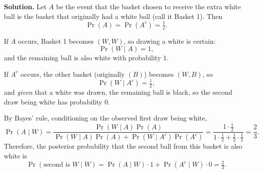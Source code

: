\documentclass{article}
\begin{document}
\textbf{Solution.}
Let $A$ be the event that the basket chosen to receive the extra white ball is the basket that originally had a white ball (call it Basket 1). Then
\[
\Pr(A)=\Pr(A^c)=\tfrac12.
\]

If $A$ occurs, Basket 1 becomes $(W,W)$, so drawing a white is certain:
\[
\Pr(W\mid A)=1,
\]
and the remaining ball is also white with probability $1$.

If $A^c$ occurs, the other basket (originally $(B)$) becomes $(W,B)$, so
\[
\Pr(W\mid A^c)=\tfrac12,
\]
and \emph{given} that a white was drawn, the remaining ball is black, so the second draw being white has probability $0$.

By Bayes' rule, conditioning on the observed first draw being white,
\[
\Pr(A\mid W)=\frac{\Pr(W\mid A)\Pr(A)}{\Pr(W\mid A)\Pr(A)+\Pr(W\mid A^c)\Pr(A^c)}
=\frac{1\cdot \tfrac12}{1\cdot \tfrac12+\tfrac12\cdot \tfrac12}
=\frac{2}{3}.
\]
Therefore, the posterior probability that the second ball from this basket is also white is
\[
\Pr(\text{second is } W \mid W)=\Pr(A\mid W)\cdot 1+\Pr(A^c\mid W)\cdot 0=\boxed{\tfrac{2}{3}}.
\]
\end{document}

